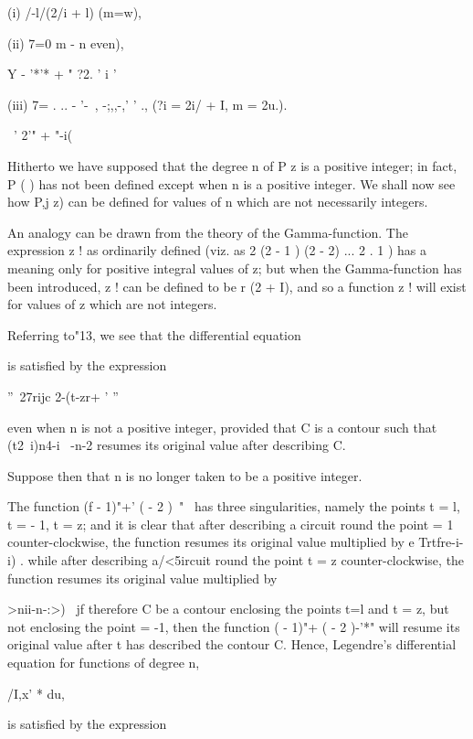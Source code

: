 {(i) /-l/(2/i + l) (m=w),

(ii) 7=0 m - n even),

Y - '*'* + " ?2. ' i '

(iii) 7= . .. - '-~, -;,,-,' ' ., (?i = 2i/ + I, m = 2u.).

\ ' 2'" + "-i(%


Hitherto we have supposed that the degree n of P z is a positive
integer; in fact, P ( ) has not been defined except when n is a
positive integer. We shall now see how P,j z) can be defined for
values of n which are not necessarily integers.

An analogy can be drawn from the theory of the Gamma-function. The
expression z ! as ordinarily defined (viz. as 2 (2 - 1 ) (2 - 2) ... 2
. 1 ) has a meaning only for positive integral values of z; but when
the Gamma-function has been introduced, z ! can be defined to be r (2
+ I), and so a function z ! will exist for values of z which are not
integers.

Referring to"13, we see that the differential equation

is satisfied by the expression

''~27rijc 2-(t-zr+ ' ''

even when n is not a positive integer, provided that C is a contour
such that (t2\ i)n4-i \ -n-2 resumes its original value after
describing C.

Suppose then that n is no longer taken to be a positive integer.

The function (f - 1)"+' ( - 2 )~"~ has three singularities, namely the
points t = l, t = - 1, t = z; and it is clear that after describing a
circuit round the point = 1 counter-clockwise, the function resumes
its original value multiplied by e Trtfre-i-i) . while after
describing a/<5ircuit round the point t = z counter-clockwise, the
function resumes its original value multiplied by

%
%

  >nii-n-:>) \ jf therefore C be a contour enclosing the points t=l
and t = z, but not enclosing the point = -1, then the function ( -
1)"+ ( - 2 )-'*" will resume its original value after t has described
the contour C. Hence, Legendre's differential equation for functions
of degree n,

/I,x' * du,

is satisfied by the expression

}
